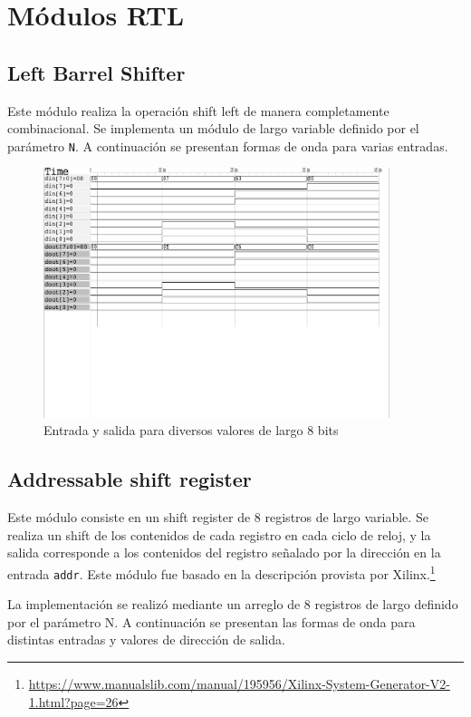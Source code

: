 \documentclass[letterpaper, 12pt]{article}
\numberwithin{equation}{section}
\begin{document}
\section{Módulos RTL}

\subsection{Left Barrel Shifter}

Este módulo realiza la operación shift left de manera completamente combinacional. Se implementa un módulo de largo variable definido por el parámetro \texttt{N}. A continuación se presentan formas de onda para varias entradas.

\begin{figure}[H]
  \centering
  \includegraphics[width=0.9\textwidth]{../testbench/lbshifter/waves_lbshifter.pdf}
  \caption{Entrada y salida para diversos valores de largo 8 bits}
\end{figure}

\subsection{Addressable shift register}

Este módulo consiste en un shift register de 8 registros de largo variable. Se realiza un shift de los contenidos de cada registro en cada ciclo de reloj, y la salida corresponde a los contenidos del registro señalado por la dirección en la entrada \texttt{addr}. Este módulo fue basado en la descripción provista por Xilinx.\footnote{\url{https://www.manualslib.com/manual/195956/Xilinx-System-Generator-V2-1.html?page=26}}

La implementación se realizó mediante un arreglo de 8 registros de largo definido por el parámetro N. A continuación se presentan las formas de onda para distintas entradas y valores de dirección de salida.
\end{document}
